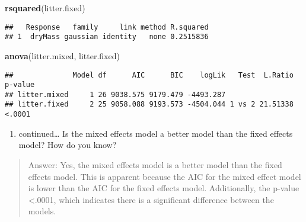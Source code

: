 \documentclass[]{article}
\newenvironment{Shaded}{\begin{snugshade}}{\end{snugshade}}
\newcommand{\KeywordTok}[1]{\textcolor[rgb]{0.13,0.29,0.53}{\textbf{#1}}}
\newcommand{\NormalTok}[1]{#1}
\providecommand{\tightlist}{%
  \setlength{\itemsep}{0pt}\setlength{\parskip}{0pt}}
\begin{document}
\begin{Shaded}
\begin{Highlighting}[]
\KeywordTok{rsquared}\NormalTok{(litter.fixed)}
\end{Highlighting}
\end{Shaded}

\begin{verbatim}
##   Response   family     link method R.squared
## 1  dryMass gaussian identity   none 0.2515836
\end{verbatim}

\begin{Shaded}
\begin{Highlighting}[]
\KeywordTok{anova}\NormalTok{(litter.mixed, litter.fixed)}
\end{Highlighting}
\end{Shaded}

\begin{verbatim}
##              Model df      AIC      BIC    logLik   Test  L.Ratio p-value
## litter.mixed     1 26 9038.575 9179.479 -4493.287                        
## litter.fixed     2 25 9058.088 9193.573 -4504.044 1 vs 2 21.51338  <.0001
\end{verbatim}

\begin{enumerate}
\def\labelenumi{\alph{enumi}.}
\setcounter{enumi}{3}
\tightlist
\item
  continued\ldots{} Is the mixed effects model a better model than the
  fixed effects model? How do you know?
\end{enumerate}

\begin{quote}
Answer: Yes, the mixed effects model is a better model than the fixed
effects model. This is apparent because the AIC for the mixed effect
model is lower than the AIC for the fixed effects model. Additionally,
the p-value \textless{}.0001, which indicates there is a significant
difference between the models.
\end{quote}
\end{document}
